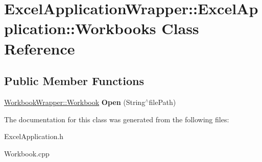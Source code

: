 \hypertarget{class_excel_application_wrapper_1_1_excel_application_1_1_workbooks}{}\section{Excel\+Application\+Wrapper\+:\+:Excel\+Application\+:\+:Workbooks Class Reference}
\label{class_excel_application_wrapper_1_1_excel_application_1_1_workbooks}
\subsection*{Public Member Functions}
\begin{DoxyCompactItemize}
\item 
\hypertarget{class_excel_application_wrapper_1_1_excel_application_1_1_workbooks_a6d82a13abac20c3f30253fc64c75b17c}{}\hyperlink{class_workbook_wrapper_1_1_workbook}{Workbook\+Wrapper\+::\+Workbook} {\bfseries Open} (String$^\wedge$file\+Path)\label{class_excel_application_wrapper_1_1_excel_application_1_1_workbooks_a6d82a13abac20c3f30253fc64c75b17c}

\end{DoxyCompactItemize}


The documentation for this class was generated from the following files\+:\begin{DoxyCompactItemize}
\item 
Excel\+Application.\+h\item 
Workbook.\+cpp\end{DoxyCompactItemize}

